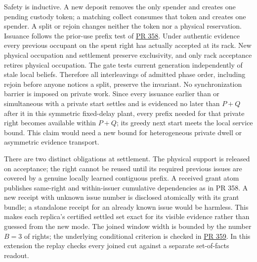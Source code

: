 \documentclass[11pt]{article}
\begin{document}
Safety is inductive. A new deposit removes the only spender and creates one pending custody token; a matching collect consumes that token and creates one spender. A split or rejoin changes neither the token nor a physical reservation. Issuance follows the prior-use prefix test of \href{https://github.com/eternal-november/eos-research-programmes/pull/358}{PR 358}. Under authentic evidence every previous occupant on the spent right has actually accepted at its rack. New physical occupation and settlement preserve exclusivity, and only rack acceptance retires physical occupation. The gate tests current generation independently of stale local beliefs. Therefore all interleavings of admitted phase order, including rejoin before anyone notices a split, preserve the invariant. No synchronization barrier is imposed on private work. Since every issuance earlier than or simultaneous with a private start settles and is evidenced no later than $P+Q$ after it in this symmetric fixed-delay plant, every prefix needed for that private right becomes available within $P+Q$; its greedy next start meets the local service bound. This claim would need a new bound for heterogeneous private dwell or asymmetric evidence transport.

There are two distinct obligations at settlement. The physical support is released on acceptance; the right cannot be reused until its required previous issues are covered by a genuine locally learned contiguous prefix. A received grant atom publishes same-right and within-issuer cumulative dependencies as in PR 358. A new receipt with unknown issue number is disclosed atomically with its grant bundle; a standalone receipt for an already known issue would be harmless. This makes each replica's certified settled set exact for its visible evidence rather than guessed from the new mode. The joined window width is bounded by the number $B=3$ of rights; the underlying conditional criterion is checked in \href{https://github.com/eternal-november/eos-research-programmes/pull/359}{PR 359}. In this extension the replay checks every joined cut against a separate set-of-facts readout.
\end{document}
